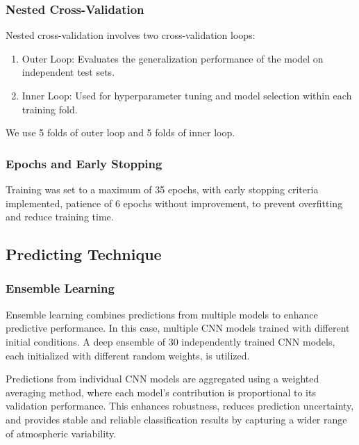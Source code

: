 \documentclass[
]{krantz}
\providecommand{\tightlist}{%
  \setlength{\itemsep}{0pt}\setlength{\parskip}{0pt}}
\begin{document}
\subsubsection{Nested Cross-Validation}\label{nested-cross-validation}

Nested cross-validation \citep{Zhong2023} involves two cross-validation loops:

\begin{enumerate}
\def\labelenumi{\arabic{enumi}.}
\tightlist
\item
  Outer Loop: Evaluates the generalization performance of the model on independent test sets.
\item
  Inner Loop: Used for hyperparameter tuning and model selection within each training fold.
\end{enumerate}

We use 5 folds of outer loop and 5 folds of inner loop.

\subsubsection{Epochs and Early Stopping}\label{epochs-and-early-stopping}

Training was set to a maximum of 35 epochs, with early stopping criteria implemented, patience of 6 epochs without improvement,
to prevent overfitting and reduce training time.

\subsection{Predicting Technique}\label{predicting-technique}

\subsubsection{Ensemble Learning}\label{ensemble-learning}

Ensemble learning \citep{Dietterich2002} combines predictions from multiple models to enhance predictive performance.
In this case, multiple CNN models trained with different initial conditions.
A deep ensemble of 30 independently trained CNN models, each initialized with different random weights, is utilized.

Predictions from individual CNN models are aggregated using a weighted averaging method, where each model's contribution is proportional to its validation performance.
This enhances robustness, reduces prediction uncertainty, and provides stable and reliable classification results by capturing a wider range of atmospheric variability.
\end{document}
